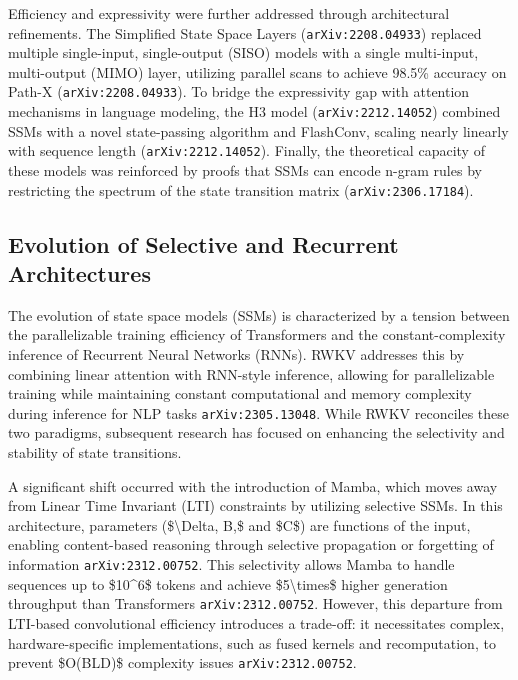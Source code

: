 \documentclass[11pt]{article}
\begin{document}
Efficiency and expressivity were further addressed through architectural refinements. The Simplified State Space Layers (\texttt{arXiv:2208.04933}) replaced multiple single-input, single-output (SISO) models with a single multi-input, multi-output (MIMO) layer, utilizing parallel scans to achieve 98.5\% accuracy on Path-X (\texttt{arXiv:2208.04933}). To bridge the expressivity gap with attention mechanisms in language modeling, the H3 model (\texttt{arXiv:2212.14052}) combined SSMs with a novel state-passing algorithm and FlashConv, scaling nearly linearly with sequence length (\texttt{arXiv:2212.14052}). Finally, the theoretical capacity of these models was reinforced by proofs that SSMs can encode n-gram rules by restricting the spectrum of the state transition matrix (\texttt{arXiv:2306.17184}).

\subsection{Evolution of Selective and Recurrent Architectures}

The evolution of state space models (SSMs) is characterized by a tension between the parallelizable training efficiency of Transformers and the constant-complexity inference of Recurrent Neural Networks (RNNs). RWKV addresses this by combining linear attention with RNN-style inference, allowing for parallelizable training while maintaining constant computational and memory complexity during inference for NLP tasks \texttt{arXiv:2305.13048}. While RWKV reconciles these two paradigms, subsequent research has focused on enhancing the selectivity and stability of state transitions.

A significant shift occurred with the introduction of Mamba, which moves away from Linear Time Invariant (LTI) constraints by utilizing selective SSMs. In this architecture, parameters (\$\textbackslash{}Delta, B,\$ and \$C\$) are functions of the input, enabling content-based reasoning through selective propagation or forgetting of information \texttt{arXiv:2312.00752}. This selectivity allows Mamba to handle sequences up to \$10\textasciicircum{}6\$ tokens and achieve \$5\textbackslash{}times\$ higher generation throughput than Transformers \texttt{arXiv:2312.00752}. However, this departure from LTI-based convolutional efficiency introduces a trade-off: it necessitates complex, hardware-specific implementations, such as fused kernels and recomputation, to prevent \$O(BLD)\$ complexity issues \texttt{arXiv:2312.00752}.
\end{document}
